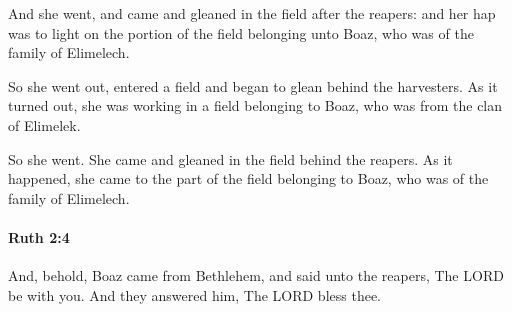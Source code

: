 			\begin{versebox}
					\item[BHS] 
					\item[LXX] 
					\item[ASV] And she went, and came and gleaned in the field after the reapers: and her hap was to light on the portion of the field belonging unto Boaz, who was of the family of Elimelech.
					\item[NIV] So she went out, entered a field and began to glean behind the harvesters. As it turned out, she was working in a field belonging to Boaz, who was from the clan of Elimelek.
					\item[NRSV] So she went. She came and gleaned in the field behind the reapers. As it happened, she came to the part of the field belonging to Boaz, who was of the family of Elimelech.
			\end{versebox}

		\paragraph{Ruth 2:4} %
			\label{RUTH-2-4}

			And, behold, Boaz came from Bethlehem, and said unto the reapers, The LORD be with you. And they answered him, The LORD bless thee.

